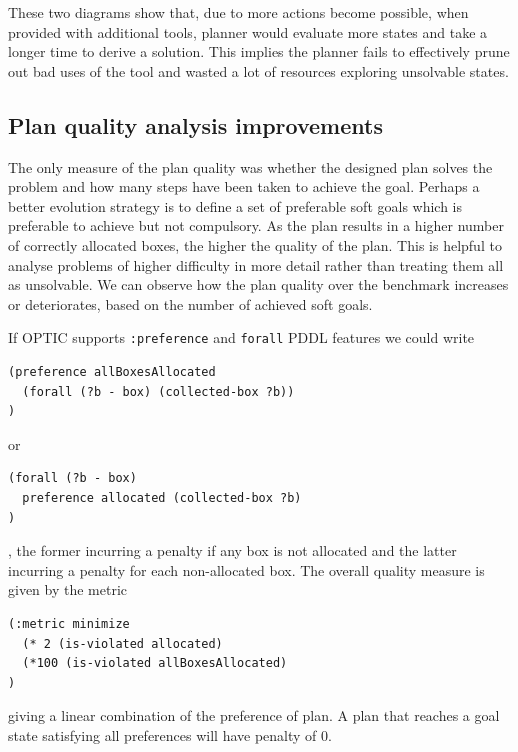 \documentclass[letterpaper]{article} %
\begin{document}
These two diagrams show that, due to more actions become possible,
when provided with additional tools, planner would evaluate more
states and take a longer time to derive a solution. This implies
the planner fails to effectively prune out bad uses of the tool and
wasted a lot of resources exploring unsolvable states.
\subsection{Plan quality analysis improvements}
The only measure of the plan quality was whether
the designed plan solves the problem and how many
steps have been taken to achieve the goal. Perhaps a better
evolution strategy is to define a set of preferable
soft goals which is preferable to achieve but not
compulsory. As the plan results in a higher number
of correctly allocated boxes, the higher the quality
of the plan.  This is helpful to analyse problems
of higher difficulty in more detail rather than
treating them all as unsolvable. We can observe
how the plan quality over the benchmark increases
or deteriorates, based on the number of achieved
soft goals.

If OPTIC supports \texttt{:preference} and \texttt{forall}
PDDL features we could write
\begin{verbatim}
(preference allBoxesAllocated
  (forall (?b - box) (collected-box ?b))
)
\end{verbatim}
or
\begin{verbatim}
(forall (?b - box)
  preference allocated (collected-box ?b)
)
\end{verbatim}
, the former incurring a penalty if any box is
 not allocated and the latter incurring a
 penalty for each non-allocated box.
 The overall quality measure is given by the metric
\begin{verbatim}
(:metric minimize
  (* 2 (is-violated allocated)
  (*100 (is-violated allBoxesAllocated)
)
\end{verbatim}
 giving a linear combination of the preference of plan.
 A plan that reaches a goal state satisfying
 all preferences will have penalty of 0.

\newpage



\end{document}
